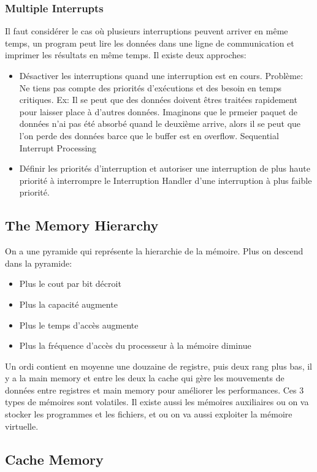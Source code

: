\subsubsection{Multiple Interrupts}
Il faut considérer le cas où plusieurs interruptions peuvent arriver en même temps, un program peut lire les données dans une ligne de communication et imprimer les résultats en même temps.
Il existe deux approches:


\begin{itemize}
	  \item Désactiver les interruptions quand une interruption est en cours. Problème: Ne tiens pas compte des priorités d’exécutions et des besoin en temps critiques. Ex: Il se peut que des données doivent êtres traitées rapidement pour laisser place à d’autres données. Imaginons que le prmeier paquet de données n’ai pas été absorbé quand le deuxième arrive, alors il se peut que l’on perde des données barce que le buffer est en overflow. Sequential Interrupt Processing
 	 \item Définir les priorités d’interruption et autoriser une interruption de plus haute priorité à interrompre le Interruption Handler d’une interruption à plus faible priorité.
\end{itemize}

\subsection{The Memory Hierarchy}
On a une pyramide qui représente la hierarchie de la mémoire. Plus on descend dans la pyramide:
\begin{itemize}
	\item Plus le cout par bit décroit
	\item Plus la capacité augmente
	\item Plus le temps d’accès augmente
	\item Plus la fréquence d’accès du processeur à la mémoire diminue
\end {itemize}
Un ordi contient en moyenne une douzaine de registre, puis deux rang plus bas, il y a la main memory et entre les deux la cache qui gère les mouvements de données entre registres et main memory pour améliorer les performances. Ces 3 types de mémoires sont volatiles. Il existe aussi les mémoires auxiliaires ou on va stocker les programmes et les fichiers, et ou on va aussi exploiter la mémoire virtuelle.

\subsection{Cache Memory}
